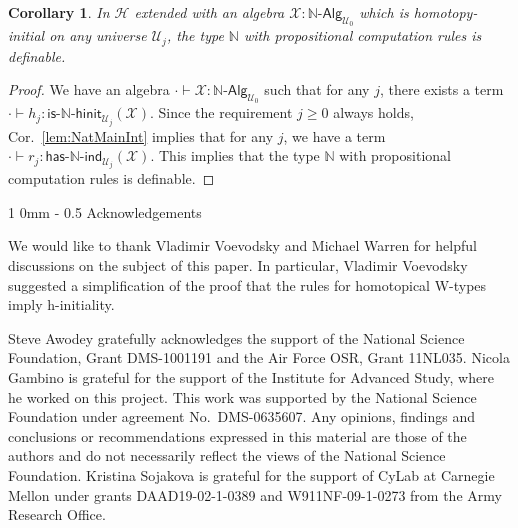 \documentclass[reqno,10pt,a4paper,oneside]{amsart}
\makeatletter
\newcommand{\X}{\mathcal{X}}
\newcommand{\nat}{\ensuremath{\mathbb{N}}}
\newcommand{\UU}{\mathcal{U}}
\newcommand{\NatAlg}{\nat\text{-}\mathsf{Alg}}
\newcommand{\HasNatInd}{\mathsf{has}\text{-}\nat\text{-}\mathsf{ind}}
\newcommand{\IsNatHInit}{\mathsf{is}\text{-}\nat\text{-}\mathsf{hinit}}
\newcommand{\Hint}{\mathcal{H}}
\renewcommand{\section}{\@startsection
  {section}%
   {1}%
  {0mm}%
   {-\baselineskip}%
  {0.5\baselineskip}%
   {\Large\bfseries}}%
\numberwithin{equation}{section}
\theoremstyle{mythm}
\newtheorem{corollary}[theorem]{Corollary}
\theoremstyle{mydef}
\theoremstyle{myrmk}
\makeatother
\begin{document}
\begin{corollary}\label{lem:NatCharInt}
In $\Hint$ extended with an algebra $\X : \NatAlg_{\UU_0}$ which is homotopy-initial on any universe $\UU_j$, the type $\nat$ with propositional computation rules is definable. 
\end{corollary}
\begin{proof}
We have an algebra $\cdot \vdash \X : \NatAlg_{\UU_0}$ such that for any $j$, there exists a term $\cdot \vdash h_j  : \IsNatHInit_{\UU_j}(\X)$. Since the requirement $j \geq 0$ always holds, Cor.~\ref{lem:NatMainInt} implies that for any $j$, we have a term $\cdot \vdash r_j : \HasNatInd_{\UU_j}(\X)$. This implies that the type $\nat$ with propositional computation rules is definable.
\end{proof}






\section{Acknowledgements}

We would like to thank Vladimir Voevodsky and Michael Warren for helpful discussions
on the subject of this paper. In particular, Vladimir Voevodsky suggested a simplification of the 
proof that the rules for homotopical W-types imply h-initiality.

Steve Awodey gratefully acknowledges the support of the National Science Foundation, Grant DMS-1001191
 and the Air Force OSR, Grant 11NL035.
Nicola Gambino is grateful for the support of the Institute for Advanced Study, where
he worked on this project. This work was supported by the National Science Foundation 
under agreement No.\ DMS-0635607. Any opinions, findings and conclusions or recommendations
expressed in this material are those of the authors and do not necessarily reflect the views of
the National Science Foundation.
Kristina Sojakova is grateful for the support of CyLab at Carnegie
Mellon under grants DAAD19-02-1-0389 and W911NF-09-1-0273 from the Army
Research Office.






                        
\end{document}
